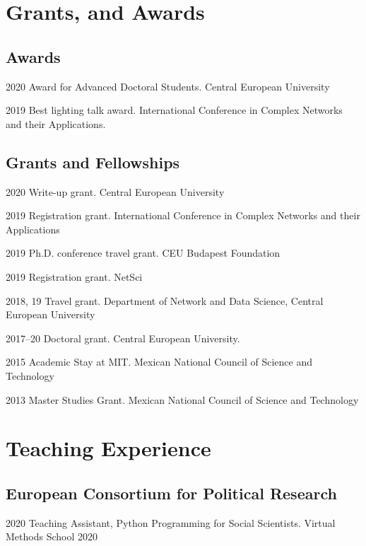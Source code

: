 \documentclass{academiccv}
\begin{document}
\section*{Grants, and Awards}
\subsection*{Awards}
\begin{tablist}
	\item[2020] \tab Award for Advanced Doctoral Students. Central European University 
	\item[2019] \tab Best lighting talk award. International Conference in Complex Networks and their Applications. 
\end{tablist}

\subsection*{Grants and Fellowships}
\begin{tablist}
	\item[2020] \tab Write-up grant. Central European University 
	\item[2019] \tab Registration grant. International Conference in Complex Networks and their Applications
	\item[2019] \tab Ph.D. conference travel grant. CEU Budapest Foundation
	\item[2019] \tab Registration grant. NetSci 
	\item[2018, 19] \tab Travel grant. Department of Network and Data Science, Central European University
	\item[2017--20] \tab Doctoral grant. Central European University. 
	\item[2015] \tab Academic Stay at MIT. Mexican National Council of Science and Technology
	\item[2013] \tab Master Studies Grant. Mexican National Council of Science and Technology
\end{tablist}

\section*{Teaching Experience}
\subsection*{European Consortium for Political Research}
\begin{tablist}
	\item[2020] \tab Teaching Assistant, Python Programming for Social Scientists. Virtual Methods School 2020
\end{tablist}
\end{document}
